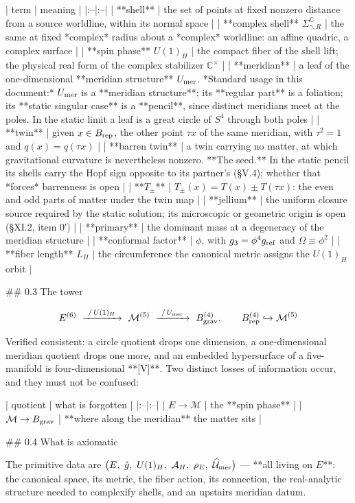 | term | meaning |
|:--|:--|
| **shell** | the set of points at fixed nonzero distance from a source worldline, within its normal space |
| **complex shell** $\Sigma^\mathbb{C}_{\gamma,R}$ | the same at fixed *complex* radius about a *complex* worldline: an affine quadric, a complex surface |
| **spin phase** $U(1)_H$ | the compact fiber of the shell lift; the physical real form of the complex stabilizer $\mathbb{C}^\times$ |
| **meridian** | a leaf of the one-dimensional **meridian structure** $U_{\rm mer}$. *Standard usage in this document:* $U_{\rm mer}$ is a **meridian structure**; its **regular part** is a foliation; its **static singular case** is a **pencil**, since distinct meridians meet at the poles. In the static limit a leaf is a great circle of $S^4$ through both poles |
| **twin** | given $x\in B_{\rm rep}$, the other point $\tau x$ of the same meridian, with $\tau^2 = 1$ and $q(x) = q(\tau x)$ |
| **barren twin** | a twin carrying no matter, at which gravitational curvature is nevertheless nonzero. **The seed.** In the static pencil its shells carry the Hopf sign opposite to its partner's (§V.4); whether that *forces* barrenness is open |
| **$T_\pm$** | $T_\pm(x) = T(x)\pm T(\tau x)$: the even and odd parts of matter under the twin map |
| **jellium** | the uniform closure source required by the static solution; its microscopic or geometric origin is open (§XI.2, item 0′) |
| **primary** | the dominant mass at a degeneracy of the meridian structure |
| **conformal factor** | $\phi$, with $g_3 = \phi^4g_{\rm ref}$ and $\Omega\equiv\phi^2$ |
| **fiber length** $L_H$ | the circumference the canonical metric assigns the $U(1)_H$ orbit |

## 0.3 The tower

$$E^{(6)}\ \xrightarrow{\ /\,U(1)_H\ }\ \mathcal{M}^{(5)}\ \xrightarrow{\ /\,U_{\rm mer}\ }\ B_{\rm grav}^{(4)},\qquad B_{\rm rep}^{(4)}\hookrightarrow\mathcal{M}^{(5)}$$

Verified consistent: a circle quotient drops one dimension, a one-dimensional meridian quotient drops one more, and an embedded hypersurface of a five-manifold is four-dimensional **[V]**. Two distinct losses of information occur, and they must not be confused:

| quotient | what is forgotten |
|:--|:--|
| $E\to\mathcal{M}$ | the **spin phase** |
| $\mathcal{M}\to B_{\rm grav}$ | **where along the meridian** the matter sits |

## 0.4 What is axiomatic

The primitive data are $\big(E,\ \hat g,\ U(1)_H,\ \mathcal{A}_H,\ \rho_E,\ \widehat{\mathcal{U} }_{\rm mer}\big)$ — **all living on $E$**: the canonical space, its metric, the fiber action, its connection, the real-analytic structure needed to complexify shells, and an upstairs meridian datum.

